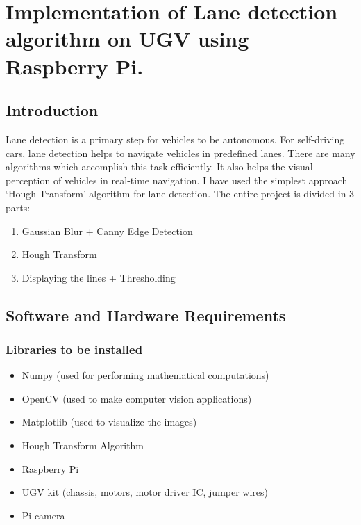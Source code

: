 \chapter{Implementation of Lane detection algorithm on UGV using Raspberry Pi.}
\section{Introduction}
\par Lane detection is a primary step for vehicles to be autonomous. For self-driving cars, lane detection helps to navigate vehicles in predefined lanes. There are many algorithms which accomplish this task efficiently. It also helps the visual perception of vehicles in real-time navigation.
I have used the simplest approach ‘Hough Transform’ algorithm for lane detection.  
The entire project is divided in 3 parts:
\begin{enumerate}
    \item Gaussian Blur + Canny Edge Detection
    \item Hough Transform
    \item Displaying the lines + Thresholding 
\end{enumerate}

\section{Software and Hardware Requirements}
\subsection{Libraries to be installed}
\begin{itemize}
    \item Numpy (used for performing mathematical computations)
    \item OpenCV (used to make computer vision applications)
    \item Matplotlib (used to visualize the images)
    \item Hough Transform Algorithm
    \item Raspberry Pi 
    \item UGV kit (chassis, motors, motor driver IC, jumper wires)
    \item Pi camera 
\end{itemize}

